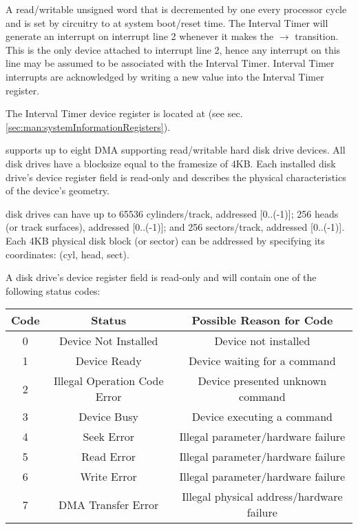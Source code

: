 \label{sec:man:intervalTimer}

A read/writable unsigned word that is decremented by one every processor cycle and is set by \uarm{} circuitry to  at system boot/reset time. 
The Interval Timer will generate an interrupt on interrupt line 2 whenever it makes the  $\rightarrow$  transition.
This is the only device attached to interrupt line 2, hence any interrupt on this line may be assumed to be associated with the Interval Timer. 
Interval Timer interrupts are acknowledged by writing a new value into the Interval Timer register.

The Interval Timer device register is located at  (see sec. \ref{sec:man:systemInformationRegisters}).



\uarm{} supports up to eight DMA supporting read/writable hard disk drive devices. 
All \uarm{} disk drives have a blocksize equal to the \uarm{} framesize of 4KB. 
Each installed disk drive’s device register  field is read-only and describes the physical characteristics of the device’s geometry.


\uarm{} disk drives can have up to 65536 cylinders/track, addressed [0..(-1)]; 256 heads (or track surfaces), addressed [0..(-1)]; and 256 sectors/track, addressed [0..(-1)]. Each 4KB physical disk block (or sector) can be addressed by specifying its coordinates: (cyl, head, sect).

A disk drive’s device register  field is read-only and will contain one of the following status codes:

\begin{center}
	\begin{tabular}{|c|c|c|}
		\hline
		Code & Status & Possible Reason for Code \\
		\hline
		\hline
		0 & Device Not Installed & Device not installed\\
		\hline
		1 & Device Ready & Device waiting for a command\\
		\hline
		2 & Illegal Operation Code Error & Device presented unknown command\\
		\hline
		3 & Device Busy & Device executing a command\\
		\hline
		4 & Seek Error & Illegal parameter/hardware failure\\
		\hline
		5 & Read Error & Illegal parameter/hardware failure\\
		\hline
		6 & Write Error & Illegal parameter/hardware failure\\
		\hline
		7 & DMA Transfer Error & Illegal physical address/hardware failure\\
		\hline
	\end{tabular}
\end{center}

